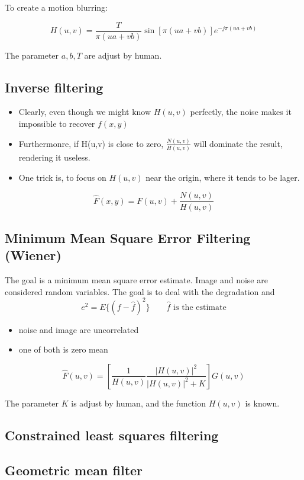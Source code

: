 To create a motion blurring:

\begin{equation}
	H(u,v) = \frac{T}{\pi (ua + vb)}\sin[\pi (ua + vb)] e^{-j \pi(ua + vb)}
\end{equation}

The parameter $a,b,T$ are adjust by human.

\subsection{Inverse filtering }

\begin{itemize}
	\item Clearly, even though we might know $H(u,v)$ perfectly, the noise makes it impossible to recover $f(x,y)$
	\item Furthermonre, if H(u,v) is close to zero, $\frac{N(u,v)}{H(u,v)}$ will dominate the result, rendering it useless.
	\item One trick is, to focus on $H(u,v)$ near the origin, where it tends to be lager.
\end{itemize}

\begin{equation}
	\hat{F}(x,y)= F(u,v) + \frac{N(u,v)}{H(u,v)}
\end{equation}


\subsection{Minimum Mean Square Error Filtering (Wiener) }
The goal is a minimum mean square error estimate. Image and noise are considered random variables. The goal is to deal with the degradation and 
\begin{equation}
	e^2 = E\{(f- \hat{f})^2 \} \qquad \hat{f} \text{ is the estimate}
\end{equation}

\begin{itemize}
	\item noise and image are uncorrelated
	\item one of both is zero mean
\end{itemize}

\begin{equation}
	\hat{F}(u,v) = \left[ \frac{1}{H(u,v)} \frac{|H(u,v)|^2}{|H(u,v)|^2 +K} \right] G(u,v)
\end{equation}

The parameter $K$ is adjust by human, and the function $H(u,v)$ is known.

\subsection{Constrained least squares filtering }


\subsection{Geometric mean filter }

